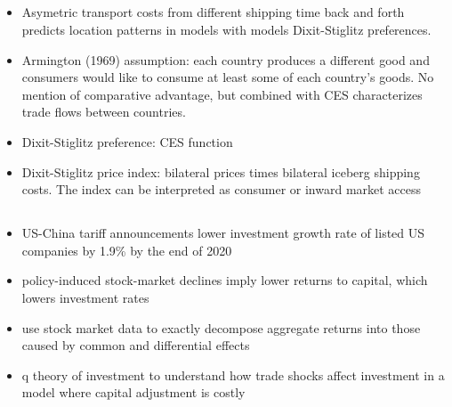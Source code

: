 \documentclass[10pt]{article} %
\begin{document}
    \subsection{\cite{ChenIoannidesRauch2022}}
    \begin{itemize}
        \item Asymetric transport costs from different shipping time back and forth predicts location patterns in models with models Dixit-Stiglitz preferences.
        \item Armington (1969) assumption: each country produces a different good and consumers would like to consume at least some of each country's goods. No mention of comparative advantage, but combined with CES characterizes trade flows between countries.
        \item Dixit-Stiglitz preference: CES function
        \item Dixit-Stiglitz price index: bilateral prices times bilateral iceberg shipping costs. The index can be interpreted as consumer or inward market access
    \end{itemize}

    \subsection{\cite{AmitiKongWeinstein2020}}
    \begin{itemize}
        \item US-China tariff announcements lower investment growth rate of listed US companies by 1.9\% by the end of 2020
        \item policy-induced stock-market declines imply lower returns to capital, which lowers investment rates
        \item use stock market data to exactly decompose aggregate returns into those caused by common and differential effects
        \item q theory of investment to understand how trade shocks affect investment in a model where capital adjustment is costly
    \end{itemize}

    \subsection{\cite{AkcigitAtesImpullitti2018}}
    
	\subsection{\cite{Fernandesetal2023}}
    
\end{document}
